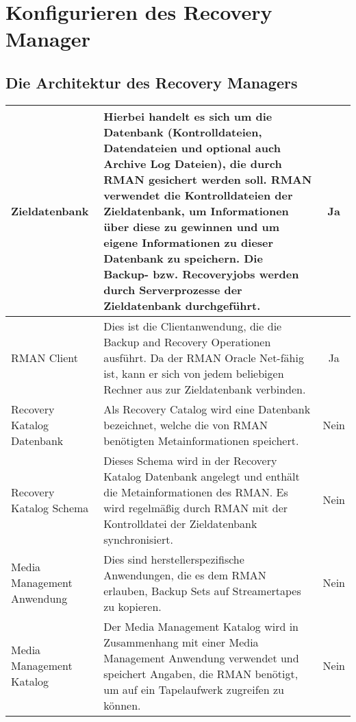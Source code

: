   \chapter{Konfigurieren des Recovery Manager}
    \setcounter{page}{1}
    \minitoc
\newpage
    \section{Die Architektur des Recovery Managers}
        \begin{center}
          \tabletail{%
            \hline
          }
          \begin{small}
            \begin{supertabular}[h]{|p{3cm}|p{10cm}|c|}
              Zieldatenbank & Hierbei handelt es sich um die Datenbank
              (Kontrolldateien, Datendateien und optional auch Archive Log
              Dateien), die durch RMAN gesichert werden soll. RMAN verwendet die
              Kontrolldateien der Zieldatenbank, um Informationen \"uber diese
              zu gewinnen und um eigene Informationen zu dieser Datenbank zu
              speichern. Die Backup- bzw. Recoveryjobs werden durch
              Serverprozesse der Zieldatenbank durchgef\"uhrt. & Ja \\
              \hline
              RMAN Client & Dies ist die Clientanwendung, die die Backup and Recovery Operationen ausf\"uhrt. Da der RMAN Oracle Net-f\"ahig ist, kann er sich von jedem beliebigen Rechner aus zur Zieldatenbank verbinden. & Ja \\
              \hline
              \raggedright Recovery Katalog Datenbank & Als Recovery Catalog wird eine Datenbank bezeichnet, welche die von RMAN ben\"otigten Metainformationen speichert. & Nein \\
              \hline
              \raggedright Recovery Katalog Schema & Dieses Schema wird in der Recovery Katalog Datenbank angelegt und enth\"alt die Metainformationen des RMAN. Es wird regelm\"a\ss{}ig durch RMAN mit der Kontrolldatei der Zieldatenbank synchronisiert. & Nein \\
              \hline
              Media Management Anwendung & Dies sind herstellerspezifische Anwendungen, die es dem RMAN erlauben, Backup Sets auf Streamertapes zu kopieren. & Nein \\
              \hline
              Media Management Katalog & Der Media Management Katalog wird in Zusammenhang mit einer Media Management Anwendung verwendet und speichert Angaben, die RMAN ben\"otigt, um auf ein Tapelaufwerk zugreifen zu k\"onnen. & Nein \\
            \end{supertabular}
          \end{small}
        \end{center}
